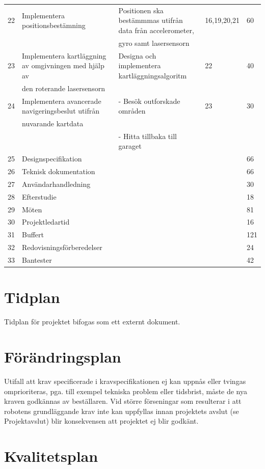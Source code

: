 \documentclass{article}
\begin{document}
\begin{table}[H]
{\begin{tabular}{| l | l | l | l | l|}
 22 & Implementera positionsbestämning & Positionen ska bestämmmas utifrån data från accelerometer, & 16,19,20,21 & 60 \\ 
   & & gyro samt lasersensorn & & \\ \hline
 23 & Implementera kartläggning av omgivningen med hjälp av & Designa och implementera kartläggningsalgoritm & 22 & 40 \\
  & den roterande lasersensorn & & & \\ \hline 
 24 & Implementera avancerade navigeringsbeslut utifrån & - Besök outforskade områden & 23 & 30 \\ 
   & nuvarande kartdata & & & \\
   & & - Hitta tillbaka till garaget & & \\ \hline
 25 & Designspecifikation & & & 66 \\ \hline
 26 & Teknisk dokumentation & & & 66 \\ \hline
 27 & Användarhandledning & & & 30 \\ \hline
 28 & Efterstudie & & & 18 \\ \hline
 29 & Möten & & & 81 \\ \hline
 30 & Projektledartid & & & 16 \\ \hline
 31 & Buffert & & & 121 \\ \hline
 32 & Redovisningsförberedelser & & & 24 \\ \hline
 33 & Bantester & & & 42 \\ \hline

 
 \end{tabular}}
\end{table}
\section{Tidplan}
Tidplan för projektet bifogas som ett externt dokument.

\section{Förändringsplan}
Utifall att krav specificerade i kravspecifikationen ej kan uppnås eller tvingas omprioriteras, pga. till exempel tekniska problem eller tidsbrist, måste de nya kraven godkännas av beställaren. Vid större förseningar som resulterar i att robotens grundläggande krav inte kan uppfyllas innan projektets avslut (se Projektavslut) blir konsekvensen att projektet ej blir godkänt.

\section{Kvalitetsplan}
\end{document}
